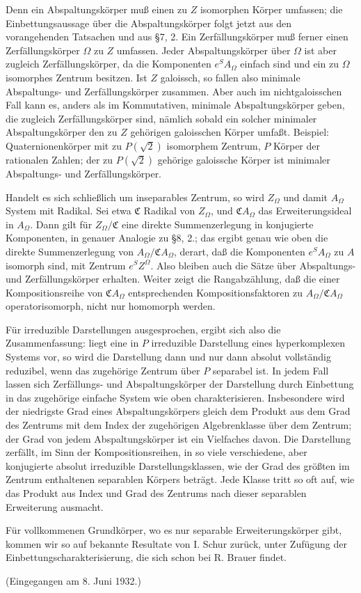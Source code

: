 \documentclass[11pt]{article}
\begin{document}
Denn ein Abspaltungskörper muß einen zu \(Z\) isomorphen Körper umfassen; die Einbettungsaussage über die Abspaltungskörper folgt jetzt aus den vorangehenden Tatsachen und aus §7, 2. Ein Zerfällungskörper muß ferner einen Zerfällungskörper \(\Omega\) zu \(Z\) umfassen. Jeder Abspaltungskörper über \(\Omega\) ist aber zugleich Zerfällungskörper, da die Komponenten \(e^S A_\Omega\) einfach sind und ein zu \(\Omega\) isomorphes Zentrum besitzen. Ist \(Z\) galoissch, so fallen also minimale Abspaltungs- und Zerfällungskörper zusammen. Aber auch im nichtgaloisschen Fall kann es, anders als im Kommutativen, minimale Abspaltungskörper geben, die zugleich Zerfällungskörper sind, nämlich sobald ein solcher minimaler Abspaltungskörper den zu \(Z\) gehörigen galoisschen Körper umfaßt. Beispiel: Quaternionenkörper mit zu \(P(\sqrt2)\) isomorphem Zentrum, \(P\) Körper der rationalen Zahlen; der zu \(P(\sqrt2)\) gehörige galoissche Körper ist minimaler Abspaltungs- und Zerfällungskörper.

Handelt es sich schließlich um inseparables Zentrum, so wird \(Z_\Omega\) und damit \(A_\Omega\) System mit Radikal. Sei etwa \(\mathfrak C\) Radikal von \(Z_\Omega\), und \(\mathfrak C A_\Omega\) das Erweiterungsideal in \(A_\Omega\). Dann gilt für \(Z_\Omega/\mathfrak C\) eine direkte Summenzerlegung in konjugierte Komponenten, in genauer Analogie zu §8, 2.; das ergibt genau wie oben die direkte Summenzerlegung von \(A_\Omega/\mathfrak C A_\Omega\), derart, daß die Komponenten \(e^SA_\Omega\) zu \(A\) isomorph sind, mit Zentrum \(e^SZ^\Omega\). Also bleiben auch die Sätze über Abspaltungs- und Zerfällungskörper erhalten. Weiter zeigt die Rangabzählung, daß die einer Kompositionsreihe von \(\mathfrak C A_\Omega\) entsprechenden Kompositionsfaktoren zu \(A_\Omega/\mathfrak C A_\Omega\) operatorisomorph, nicht nur homomorph werden.

Für irreduzible Darstellungen ausgesprochen, ergibt sich also die Zusammenfassung: liegt eine in \(P\) irreduzible Darstellung eines hyperkomplexen Systems vor, so wird die Darstellung dann und nur dann absolut vollständig reduzibel, wenn das zugehörige Zentrum über \(P\) separabel ist. In jedem Fall lassen sich Zerfällungs- und Abspaltungskörper der Darstellung durch Einbettung in das zugehörige einfache System wie oben charakterisieren. Insbesondere wird der niedrigste Grad eines Abspaltungskörpers gleich dem Produkt aus dem Grad des Zentrums mit dem Index der zugehörigen Algebrenklasse über dem Zentrum; der Grad von jedem Abspaltungskörper ist ein Vielfaches davon. Die Darstellung zerfällt, im Sinn der Kompositionsreihen, in so viele verschiedene, aber konjugierte absolut irreduzible Darstellungsklassen, wie der Grad des größten im Zentrum enthaltenen separablen Körpers beträgt. Jede Klasse tritt so oft auf, wie das Produkt aus Index und Grad des Zentrums nach dieser separablen Erweiterung ausmacht.

Für vollkommenen Grundkörper, wo es nur separable Erweiterungskörper gibt, kommen wir so auf bekannte Resultate von I. Schur zurück, unter Zufügung der Einbettungscharakterisierung, die sich schon bei R. Brauer findet.

\begin{center}
(Eingegangen am 8. Juni 1932.)
\end{center}
\end{document}
